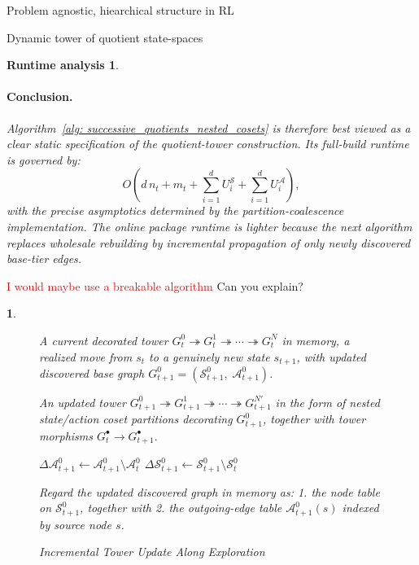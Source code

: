 \documentclass[11pt]{article}
\newtheorem{ermark}[subsubsection]{}
\newtheorem{run_analysis}[subsubsection]{Runtime analysis}
\begin{document}
\begin{section}{Problem agnostic, hiearchical structure in RL}
\begin{subsection}{Dynamic tower of quotient state-spaces}
\begin{run_analysis}
\paragraph{Conclusion.}
Algorithm~\ref{alg: successive_quotients_nested_cosets} is therefore best viewed as a clear \emph{static specification} of the quotient-tower construction. Its full-build runtime is governed by:
\[
O\!\left(
d\,n_t + m_t + \sum_{i=1}^d U_i^{\mathcal S} + \sum_{i=1}^d U_i^{\mathcal A}
\right),
\]
with the precise asymptotics determined by the partition-coalescence implementation. The online package runtime is lighter because the next algorithm replaces wholesale rebuilding by incremental propagation of only newly discovered base-tier edges.
\end{run_analysis}

\textcolor{red}{I would maybe use a breakable algorithm} {\color{blue} Can you explain?}
\begin{ermark}

\begin{figure}[!h]
\begin{algorithm}[H]
\caption{Incremental Tower Update Along Exploration}
\label{alg: incremental_tower_update}
\begin{algorithmic}[1]

\Require
A current decorated tower
$
G_t^0 \twoheadrightarrow G_t^1 \twoheadrightarrow \cdots \twoheadrightarrow G_t^N
$
in memory, a realized move from $s_t$ to a genuinely new state $s_{t+1}$, with updated discovered base graph $G_{t+1}^0=(\mathcal{S}_{t+1}^0,\;\mathcal{A}_{t+1}^0)$.

\Ensure
An updated tower
$
G_{t+1}^0 \twoheadrightarrow G_{t+1}^1 \twoheadrightarrow \cdots \twoheadrightarrow G_{t+1}^{N'}
$
in the form of nested state/action coset partitions decorating $G_{t+1}^0$, together with tower morphisms
$
G_t^\bullet \longrightarrow G_{t+1}^\bullet.
$

\Statex


    \State $\Delta\mathcal{A}_{t+1}^0 \gets \mathcal{A}_{t+1}^0\setminus \mathcal{A}_t^0$
    \State $\Delta\mathcal{S}_{t+1}^0 \gets \mathcal{S}_{t+1}^0\setminus \mathcal{S}_t^0$

    \State Regard the updated discovered graph in memory as:
    1. the node table on $\mathcal{S}_{t+1}^0$, together with
    2. the outgoing-edge table $\mathcal{A}_{t+1}^0(s)$ indexed by source node $s$.



\end{algorithmic}
\end{algorithm}
\end{figure}
\end{ermark}
\end{subsection}
\end{section}
\end{document}
